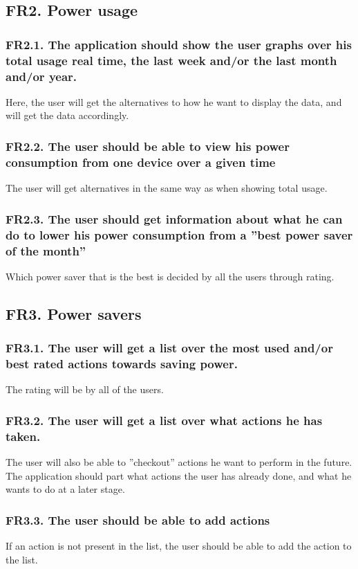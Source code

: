 \subsection{FR2. Power usage}
\subsubsection{FR2.1. The application should show the user graphs over his total usage real time, the last week and/or the last month and/or year.}
Here, the user will get the alternatives to how he want to display the data, and will get the data accordingly.

\subsubsection{FR2.2. The user should be able to view his power consumption from one device over a given time}
The user will get alternatives in the same way as when showing total usage.

\subsubsection{FR2.3. The user should get information about what he can do to lower his power consumption from a ''best power saver of the month''}
 Which power saver that is the best is decided by all the users through rating.

\subsection{FR3. Power savers}

\subsubsection{FR3.1. The user will get a list over the most used and/or best rated actions towards saving power.}
The rating will be by all of the users.

\subsubsection{FR3.2. The user will get a list over what actions he has taken.}
The user will also be able to ''checkout'' actions he want to perform in the future. The application should part what actions the user has already done, and what he wants to do at a later stage.

\subsubsection{FR3.3. The user should be able to add actions}
If an action is not present in the list, the user should be able to add the action to the list.



